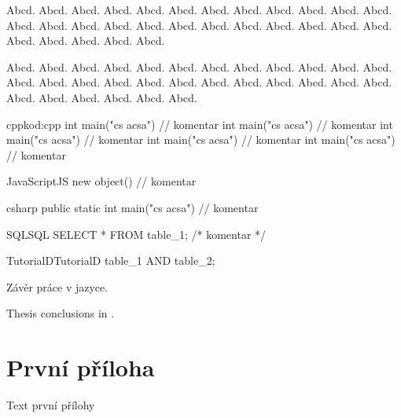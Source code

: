 \documentclass[
  program=itk,
  biblatex,
  language=czech,
  figures=false,
  glossaries,
  index
]{kidiplom}
\begin{document}
\begin{consequence}
Abcd. Abcd. Abcd. Abcd. Abcd. Abcd. Abcd. Abcd. Abcd. Abcd. Abcd. Abcd. Abcd. Abcd. Abcd. Abcd. Abcd. Abcd. Abcd. Abcd. Abcd. Abcd. Abcd. Abcd. Abcd. Abcd. Abcd. Abcd. Abcd.
\end{consequence}

\begin{theorem}
Abcd. Abcd. Abcd. Abcd. Abcd. Abcd. Abcd. Abcd. Abcd. Abcd. Abcd. Abcd. Abcd. Abcd. Abcd. Abcd. Abcd. Abcd. Abcd. Abcd. Abcd. Abcd. Abcd. Abcd. Abcd. Abcd. Abcd. Abcd. Abcd. Abcd.
\end{theorem}


\begin{kicode}{cpp}{kod:cpp}{\cpp}
int main("cs acsa") // komentar
int main("cs acsa") // komentar
int main("cs acsa") // komentar
int main("cs acsa") // komentar
int main("cs acsa") // komentar
\end{kicode}

\begin{kicode}{JavaScript}{}{JS}
new object() // komentar
\end{kicode}

\begin{kicode}{csharp}{}{\csharp}
public static int main("cs acsa") // komentar
\end{kicode}

\begin{kicode}{SQL}{}{SQL}
SELECT * FROM table_1; /* komentar */
\end{kicode}

\begin{kicode}{TutorialD}{}{TutorialD}
table_1 AND table_2;
\end{kicode}

\begin{kiconclusions}
Závěr práce v  jazyce.
\end{kiconclusions}

\begin{kiconclusions}[english]
Thesis conclusions in .
\end{kiconclusions}

\appendix

\section{První příloha}
Text první přílohy
\end{document}
